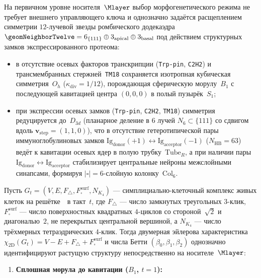 \begin{theorem}
\label{thm:bio-euler-betti-self-classification}
На первичном уровне носителя~$\Mlayer$ выбор морфогенетического режима не требует внешнего управляющего ключа и однозначно задаётся расщеплением симметрии $12$-лучевой звезды ромбического додекаэдра $\geomNeighborTwelve = 6_{\{111\}}\oplus 3_{\mathrm{apical}}\oplus 3_{\mathrm{basal}}$ под действием структурных замков экспрессированного протеома:
\begin{itemize}[leftmargin=*]
\item в отсутствие осевых факторов транскрипции (\texttt{Trp-pin}, \texttt{C2H2}) и трансмембранных стержней~\texttt{TM18} сохраняется изотропная кубическая симметрия~$O_h$ ($\kappa_{\mathrm{div}} = 1/12$), порождающая сферическую морулу~$B_1$ с последующей кавитацией центра $(0,0,0)$ в полый пузырёк~$S_1$;
\item при экспрессии осевых замков (\texttt{Trp-pin}, \texttt{C2H2}, \texttt{TM18}) симметрия редуцируется до~$D_{3d}$ (планарное деление в $6$ лучей $N_6\subset\{111\}$ со сдвигом вдоль $\mathbf{v}_{\mathrm{step}}=(1,1,0)$), что в отсутствие гетеротипической пары иммуноглобулиновых замков $\text{Ig}_{\mathrm{donor}}(+1)\leftrightarrow\text{Ig}_{\mathrm{acceptor}}(-1)$ ($N_{\mathrm{HB}}=63$) ведёт к кавитации осевых ядер в полую трубку~$\mathrm{Tube}_R$, а при наличии пары $\text{Ig}_{\mathrm{donor}}\leftrightarrow\text{Ig}_{\mathrm{acceptor}}$ стабилизирует центральные нейроны межслойными синапсами, формируя $|\square|=6$-слойную колонку~$\mathrm{Col}_6$.
\end{itemize}
Пусть $G_t = (V, E, F_\triangle, F_\square^{\mathrm{surf}}, N_{K_4})$ --- симплициально-клеточный комплекс живых клеток на решётке~\latGCKshort\ в такт~$t$, где $F_\triangle$ --- число замкнутых треугольных $3$-клик, $F_\square^{\mathrm{surf}}$ --- число поверхностных квадратных $4$-циклов со стороной~$\sqrt{2}$ и диагональю~$2$, не перекрытых центральной вершиной, а $N_{K_4}$ --- число трёхмерных тетраэдрических $4$-клик. Тогда двумерная эйлерова характеристика $\chi_{\mathrm{2D}}(G_t) = V - E + F_\triangle + F_\square^{\mathrm{surf}}$ и числа Бетти $(\beta_0,\beta_1,\beta_2)$ однозначно идентифицируют растущую структуру непосредственно на носителе~$\Mlayer$:
\begin{enumerate}[leftmargin=*]
\item \textbf{Сплошная морула до кавитации ($B_1$, $t=1$):}

\end{enumerate}
\end{theorem}
